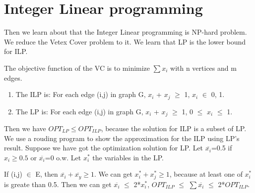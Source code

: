 \documentclass[usletter]{article}
\begin{document}
\section{Integer Linear programming}
Then we learn about that the Integer Linear programming is NP-hard problem. We reduce the Vetex Cover problem to it.
We learn that LP is the lower bound for ILP. 

The objective function of the VC is to minimize $\sum{x_{i}}$ with n vertices and m edges. 
\begin{enumerate}
	\item The ILP is: For each edge (i,j) in graph G, $x_{i}$ + $x_{j}$ $\ge$ 1, $x_{i}$ $\in$ {0, 1}.
 	\item The LP is: For each edge (i,j) in graph G, $x_{i}$ + $x_{j}$ $\ge$ 1, 0 $\le$ $x_{i}$ $\le$ 1.
\end{enumerate}

Then we have $OPT_{LP} \le OPT_{ILP}$, because the solution for ILP is a subset of LP. 
We use a rouding program to show the approximation for the ILP using LP's result. Suppose we have got the optimization solution for LP. 
Let $\overline{x_{i}}$=0.5 if $x_{i} \ge 0.5$ or $\overline{x_{i}}$=0 o.w. Let $x^*_{i}$ the variables in the LP.

If (i,j) $\in$ E, then $\overline{x_{i}}+\overline{x_{y}} \ge 1$. We can get $x^*_{i}+x^*_{j} \ge 1$, because at least one of $x^*_{i}$ is greate than 0.5.
Then we can get $\overline{x_{i}}$ $\le$ 2*$x_{i}^*$, $OPT_{ILP}$ $\le$ $\sum{\overline{x_{i}}}$ $\le$ 2*$OPT_{ILP}$.




\end{document}
